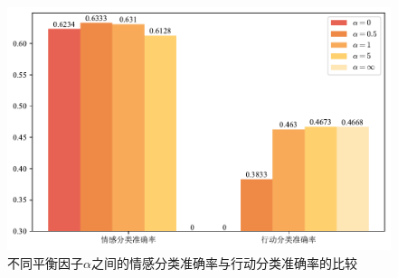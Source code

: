 \begin{figure}[htb]
	\centering
	\includegraphics[width=0.55\linewidth]{images/平衡因子.pdf}
	\caption{不同平衡因子$\alpha$之间的情感分类准确率与行动分类准确率的比较}
	\label{fig:alpha}
\end{figure}
